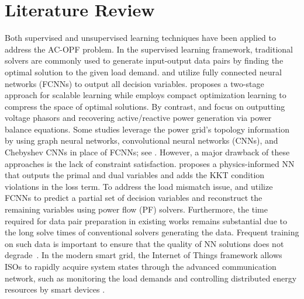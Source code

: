 \section{Literature Review}
Both supervised and unsupervised learning techniques have been applied to address the AC-OPF problem. In the supervised learning framework, traditional solvers are commonly used to generate input-output data pairs by finding the optimal solution to the given load demand. \cite{Fioretto2019} and \cite{chatzos2020} utilize fully connected neural networks (FCNNs) to output all decision variables. \cite{Chatzos2022} proposes a two-stage approach for scalable learning while \cite{Seonho2023} employs compact optimization learning to compress the space of optimal solutions. By contrast, \cite{Huang2021_v} and \cite{Lei2021} focus on outputting voltage phasors and recovering active/reactive power generation via power balance equations. Some studies leverage the power grid's topology information by using graph neural networks, convolutional neural networks (CNNs), and Chebyshev CNNs in place of FCNNs; see \cite{Owerko2020,falconer2022,Gao2023}. However, a major drawback of these approaches is the lack of constraint satisfaction. \cite{NELLIKKATH} proposes a physics-informed NN that outputs the primal and dual variables and adds the KKT condition violations in the loss term. To address the load mismatch issue, \cite{deepopf} and \cite{WANG2022} utilize FCNNs to predict a partial set of decision variables and reconstruct the remaining variables using power flow (PF) solvers. Furthermore, the time required for data pair preparation in existing works remains substantial due to the long solve times of conventional solvers generating the data. Frequent training on such data is important to ensure that the quality of NN solutions does not degrade~\cite{Zhou2023}. In the modern smart grid, the Internet of Things framework allows ISOs to rapidly acquire system states through the advanced communication network, such as monitoring the load demands and controlling distributed energy resources by smart devices \cite{ZhangIot}.

